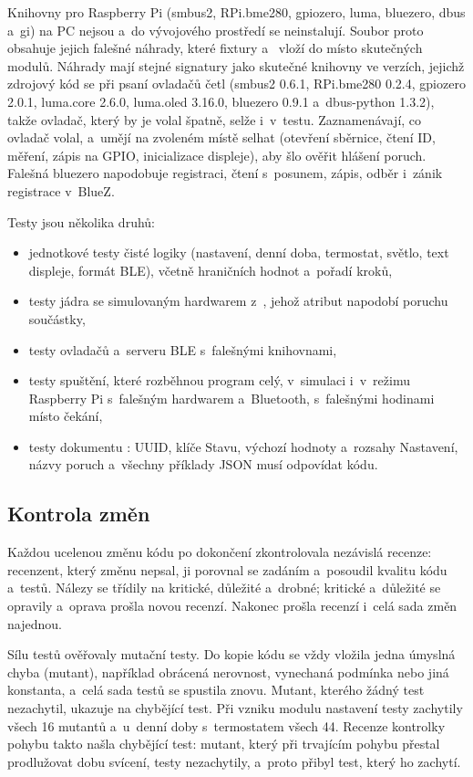Knihovny pro Raspberry Pi (smbus2, RPi.bme280, gpiozero, luma, bluezero, dbus a~gi) na PC
nejsou a~do vývojového prostředí se neinstalují. Soubor  proto obsahuje
jejich falešné náhrady, které fixtury  a~ vloží do
 místo skutečných modulů. Náhrady mají stejné signatury jako skutečné knihovny
ve verzích, jejichž zdrojový kód se při psaní ovladačů četl (smbus2 0.6.1, RPi.bme280 0.2.4,
gpiozero 2.0.1, luma.core 2.6.0, luma.oled 3.16.0, bluezero 0.9.1 a~dbus-python 1.3.2), takže
ovladač, který by je volal špatně, selže i~v~testu. Zaznamenávají, co ovladač volal, a~umějí na
zvoleném místě selhat (otevření sběrnice, čtení ID, měření, zápis na GPIO, inicializace displeje),
aby šlo ověřit hlášení poruch. Falešná bluezero napodobuje registraci, čtení s~posunem, zápis,
odběr i~zánik registrace v~BlueZ.

Testy jsou několika druhů:
\begin{itemize}
  \item jednotkové testy čisté logiky (nastavení, denní doba, termostat, světlo, text displeje,
        formát BLE), včetně hraničních hodnot a~pořadí kroků,
  \item testy jádra se simulovaným hardwarem z~, jehož atribut
         napodobí poruchu součástky,
  \item testy ovladačů a~serveru BLE s~falešnými knihovnami,
  \item testy spuštění, které rozběhnou program celý, v~simulaci i~v~režimu Raspberry Pi
        s~falešným hardwarem a~Bluetooth, s~falešnými hodinami místo čekání,
  \item testy dokumentu : UUID, klíče Stavu, výchozí hodnoty
        a~rozsahy Nastavení, názvy poruch a~všechny příklady JSON musí odpovídat kódu.
\end{itemize}

\subsection{Kontrola změn}

Každou ucelenou změnu kódu po dokončení zkontrolovala nezávislá recenze: recenzent, který změnu
nepsal, ji porovnal se zadáním a~posoudil kvalitu kódu a~testů. Nálezy se třídily na
kritické, důležité a~drobné; kritické a~důležité se opravily a~oprava prošla novou recenzí.
Nakonec prošla recenzí i~celá sada změn najednou.

Sílu testů ověřovaly mutační testy. Do kopie kódu se vždy vložila jedna úmyslná chyba (mutant),
například obrácená nerovnost, vynechaná podmínka nebo jiná konstanta, a~celá sada testů se
spustila znovu. Mutant, kterého žádný test nezachytil, ukazuje na chybějící test. Při vzniku
modulu nastavení testy zachytily všech 16 mutantů a~u~denní doby s~termostatem všech 44.
Recenze kontrolky pohybu takto našla chybějící test: mutant, který při trvajícím pohybu
přestal prodlužovat dobu svícení, testy nezachytily, a~proto přibyl test, který ho zachytí.

